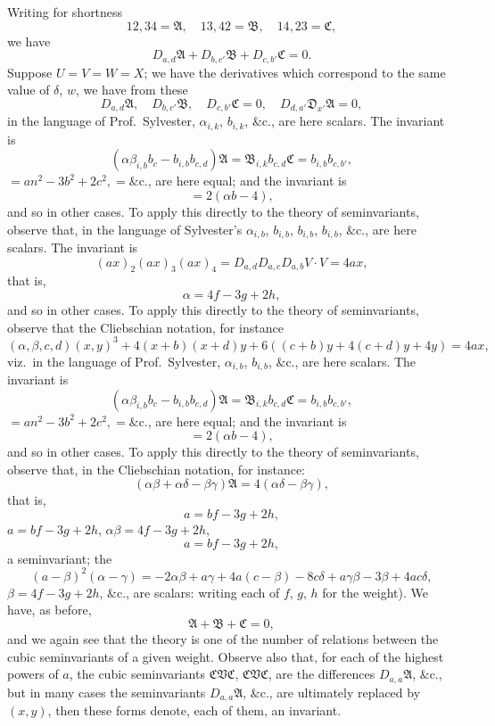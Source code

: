 \documentclass[11pt,a4paper]{book}
\begin{document}
\noindent Writing for shortness
\[
12, 34 = \mathfrak{A}, \quad 13, 42 = \mathfrak{B}, \quad 14, 23 = \mathfrak{C},
\]
we have
\[
D_{a,d}\mathfrak{A} + D_{b,c'}\mathfrak{B} + D_{c,b'}\mathfrak{C} = 0.
\]
Suppose $U = V = W = X$; we have the derivatives which correspond to the same value of $\delta$, $w$, we have from these
\[
D_{a,d}\mathfrak{A}, \quad D_{b,c'}\mathfrak{B}, \quad D_{c,b'}\mathfrak{C} = 0, \quad D_{d,a'}\mathfrak{D}_{x'}\mathfrak{A} = 0,
\]
in the language of Prof.\ Sylvester, $\alpha_{i,k}$, $b_{i,k}$, $\&\text{c.}$, are here scalars. The invariant is
\[
(\alpha\beta_{i,b}b_{c} - b_{i,b}b_{c,d})\mathfrak{A} = \mathfrak{B}_{i,k}b_{c,d}\mathfrak{C} = b_{i,b}b_{c,b'},
\]
$= an^2 - 3b^2 + 2c^2, = \&\text{c.}$, are here equal; and the invariant is
\[
= 2(\alpha b - 4),
\]
and so in other cases. To apply this directly to the theory of seminvariants, observe that, in the language of Sylvester's $\alpha_{i,b}$, $b_{i,b}$, $b_{i,b}$, $b_{i,b}$, $\&\text{c.}$, are here scalars. The invariant is
\[
(ax)_2(ax)_3(ax)_4 = D_{a,d}D_{a,c}D_{a,b}V \cdot V = 4ax,
\]
that is,
\[
\alpha = 4f - 3g + 2h,
\]
and so in other cases. To apply this directly to the theory of seminvariants, observe that the Cliebschian notation, for instance
\[
(\alpha, \beta, c, d)(x, y)^3 + 4(x + b)(x + d)y + 6((c + b)y + 4(c + d)y + 4y) = 4ax,
\]
viz.\ in the language of Prof.\ Sylvester, $\alpha_{i,b}$, $b_{i,b}$, $\&\text{c.}$, are here scalars. The invariant is
\[
(\alpha\beta_{i,b}b_{c} - b_{i,b}b_{c,d})\mathfrak{A} = \mathfrak{B}_{i,k}b_{c,d}\mathfrak{C} = b_{i,b}b_{c,b'},
\]
$= an^2 - 3b^2 + 2c^2, = \&\text{c.}$, are here equal; and the invariant is
\[
= 2(\alpha b - 4),
\]
and so in other cases. To apply this directly to the theory of seminvariants, observe that, in the Cliebschian notation, for instance:
\[
(\alpha\beta + \alpha\delta - \beta\gamma)\mathfrak{A} = 4(\alpha\delta - \beta\gamma),
\]
that is,
\[
a = bf - 3g + 2h,
\]
$a = bf - 3g + 2h$, $\alpha\beta = 4f - 3g + 2h$,
\[
a = bf - 3g + 2h,
\]
a seminvariant; the
\[
(a - \beta)^2(\alpha - \gamma) = - 2\alpha\beta + a\gamma + 4a(c - \beta) - 8c\delta + a\gamma\beta - 3\beta + 4ac\delta,
\]
$\beta = 4f - 3g + 2h$, $\&\text{c.}$, are scalars: writing each of $f$, $g$, $h$ for the weight). We have, as before,
\[
\mathfrak{A} + \mathfrak{B} + \mathfrak{C} = 0,
\]
and we again see that the theory is one of the number of relations between the cubic seminvariants of a given weight. Observe also that, for each of the highest powers of $a$, the cubic seminvariants $\mathfrak{C}\mathfrak{V}\mathfrak{C}$, $\mathfrak{C}\mathfrak{V}\mathfrak{C}$, are the differences $D_{a,a}\mathfrak{A}$, $\&\text{c.}$, but in many cases the seminvariants $D_{a,a}\mathfrak{A}$, $\&\text{c.}$, are ultimately replaced by $(x, y)$, then these forms denote, each of them, an invariant.
\end{document}
